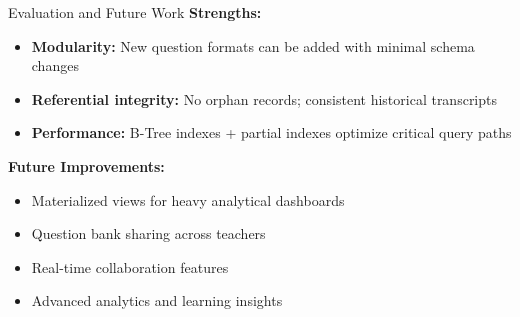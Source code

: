 \documentclass[aspectratio=169, 10pt]{beamer}
\begin{document}
\begin{frame}{Evaluation and Future Work}
    \textbf{Strengths:}
    \begin{itemize}
        \item \textbf{Modularity:} New question formats can be added with minimal schema changes
        \item \textbf{Referential integrity:} No orphan records; consistent historical transcripts
        \item \textbf{Performance:} B-Tree indexes + partial indexes optimize critical query paths
    \end{itemize}
    \vspace{0.3cm}
    \textbf{Future Improvements:}
    \begin{itemize}
        \item Materialized views for heavy analytical dashboards
        \item Question bank sharing across teachers
        \item Real-time collaboration features
        \item Advanced analytics and learning insights
    \end{itemize}
\end{frame}


\end{document}
